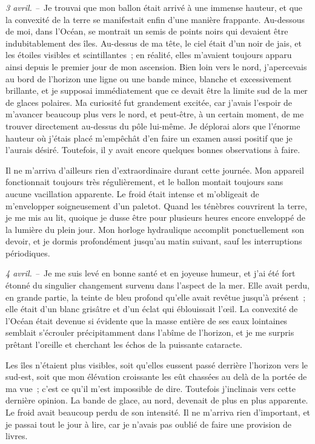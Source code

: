 \documentclass[french,twoside]{book} %
\begin{document}
\emph{3 avril. –} Je trouvai que mon ballon était arrivé à une immense hauteur, et que la convexité de la terre se manifestait enfin d’une manière frappante. Au-dessous de moi, dans l’Océan, se montrait un semis de points noirs qui devaient être indubitablement des îles. Au-dessus de ma tête, le ciel était d’un noir de jais, et les étoiles visibles et scintillantes ; en réalité, elles m’avaient toujours apparu ainsi depuis le premier jour de mon ascension. Bien loin vers le nord, j’apercevais au bord de l’horizon une ligne ou une bande mince, blanche et excessivement brillante, et je supposai immédiatement que ce devait être la limite sud de la mer de glaces polaires. Ma curiosité fut grandement excitée, car j’avais l’espoir de m’avancer beaucoup plus vers le nord, et peut-être, à un certain moment, de me trouver directement au-dessus du pôle lui-même. Je déplorai alors que l’énorme hauteur où j’étais placé m’empêchât d’en faire un examen aussi positif que je l’aurais désiré. Toutefois, il y avait encore quelques bonnes observations à faire.\par
Il ne m’arriva d’ailleurs rien d’extraordinaire durant cette journée. Mon appareil fonctionnait toujours très régulièrement, et le ballon montait toujours sans aucune vacillation apparente. Le froid était intense et m’obligeait de m’envelopper soigneusement d’un paletot. Quand les ténèbres couvrirent la terre, je me mis au lit, quoique je dusse être pour plusieurs heures encore enveloppé de la lumière du plein jour. Mon horloge hydraulique accomplit ponctuellement son devoir, et je dormis profondément jusqu’au matin suivant, sauf les interruptions périodiques.\par
\emph{4 avril. –} Je me suis levé en bonne santé et en joyeuse humeur, et j’ai été fort étonné du singulier changement survenu dans l’aspect de la mer. Elle avait perdu, en grande partie, la teinte de bleu profond qu’elle avait revêtue jusqu’à présent ; elle était d’un blanc grisâtre et d’un éclat qui éblouissait l’œil. La convexité de l’Océan était devenue si évidente que la masse entière de ses eaux lointaines semblait s’écrouler précipitamment dans l’abîme de l’horizon, et je me surpris prêtant l’oreille et cherchant les échos de la puissante cataracte.\par
Les îles n’étaient plus visibles, soit qu’elles eussent passé derrière l’horizon vers le sud-est, soit que mon élévation croissante les eût chassées au delà de la portée de ma vue ; c’est ce qu’il m’est impossible de dire. Toutefois j’inclinais vers cette dernière opinion. La bande de glace, au nord, devenait de plus en plus apparente. Le froid avait beaucoup perdu de son intensité. Il ne m’arriva rien d’important, et je passai tout le jour à lire, car je n’avais pas oublié de faire une provision de livres.\par
\end{document}
